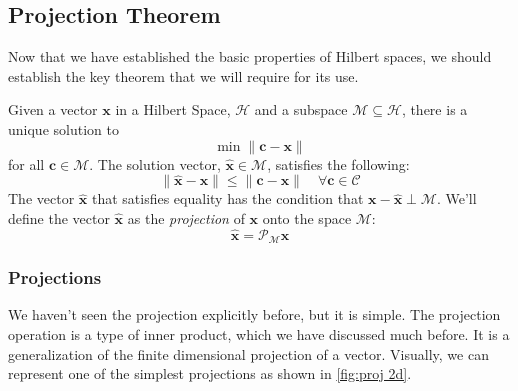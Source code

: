 \subsection{Projection Theorem}
Now that we have established the basic properties of Hilbert spaces, we should establish the key theorem that we will require for its use.

\begin{theorem}
Given a vector $\bm{x}$ in a Hilbert Space, $\mathcal{H}$ and a subspace $\mathcal{M}\subseteq \mathcal{H}$, there is a unique solution to 
$$\min\|\bm{c}-\bm{x}\|$$
for all $\bm{c}\in\mathcal{M}$. The solution vector, $\bm{\hat{x}}\in\mathcal{M}$, satisfies the following:
$$\|\bm{\hat{x}}-\bm{x}\|\leq\|\bm{c}-\bm{x}\|\quad\forall\bm{c}\in\mathcal{C}$$
The vector $\bm{\hat{x}}$ that satisfies equality has the condition that $\bm{x}-\bm{\hat{x}}\perp \mathcal{M}$. We'll define the vector $\bm{\hat{x}}$ as the \textit{projection} of $\bm{x}$ onto the space $\mathcal{M}$:
$$\bm{\hat{x}}=\mathcal{P}_{\mathcal{M}}\bm{x}$$
\end{theorem}

\subsubsection{Projections}
We haven't seen the projection explicitly before, but it is simple. The projection operation is a type of inner product, which we have discussed much before. It is a generalization of the finite dimensional projection of a vector. Visually, we can represent one of the simplest projections as shown in \autoref{fig:proj 2d}.

